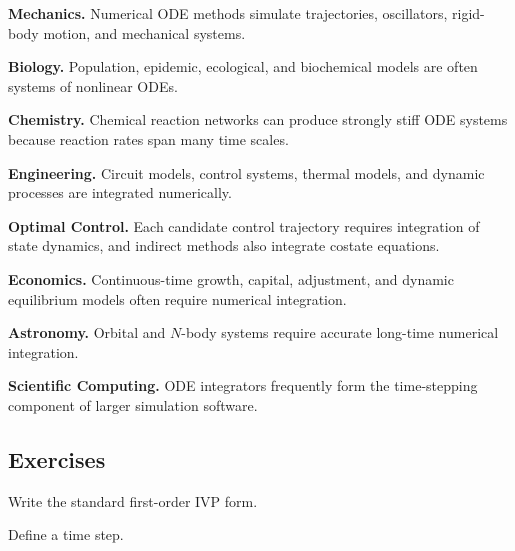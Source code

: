 \begin{applicationbox}

\textbf{Mechanics.}
Numerical ODE methods simulate trajectories, oscillators, rigid-body
motion, and mechanical systems.

\medskip

\textbf{Biology.}
Population, epidemic, ecological, and biochemical models are often systems
of nonlinear ODEs.

\medskip

\textbf{Chemistry.}
Chemical reaction networks can produce strongly stiff ODE systems because
reaction rates span many time scales.

\medskip

\textbf{Engineering.}
Circuit models, control systems, thermal models, and dynamic processes are
integrated numerically.

\medskip

\textbf{Optimal Control.}
Each candidate control trajectory requires integration of state dynamics,
and indirect methods also integrate costate equations.

\medskip

\textbf{Economics.}
Continuous-time growth, capital, adjustment, and dynamic equilibrium models
often require numerical integration.

\medskip

\textbf{Astronomy.}
Orbital and \(N\)-body systems require accurate long-time numerical
integration.

\medskip

\textbf{Scientific Computing.}
ODE integrators frequently form the time-stepping component of larger
simulation software.

\end{applicationbox}

\subsection{Exercises}
\label{subsec:numerical-ode-exercises}

\begin{exercise}[1]
Write the standard first-order IVP form.
\end{exercise}

\begin{exercise}[1]
Define a time step.
\end{exercise}

